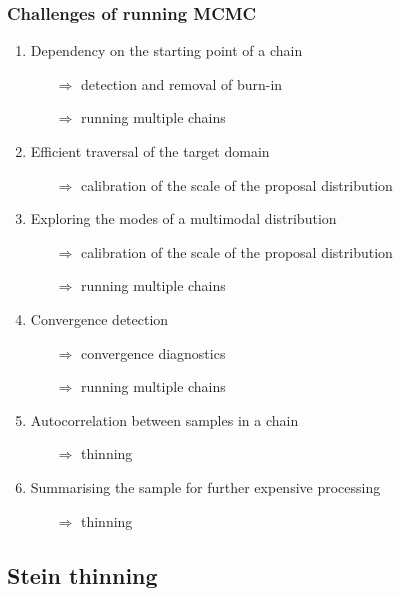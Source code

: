 \documentclass{beamer}
\begin{document}
\begin{frame}
\frametitle{Challenges of running MCMC}

\begin{enumerate}
\item Dependency on the starting point of a chain
    \begin{itemize}
        \item[$\Rightarrow$] detection and removal of burn-in
        \item[$\Rightarrow$] running multiple chains
    \end{itemize}
\item Efficient traversal of the target domain
    \begin{itemize}
        \item[$\Rightarrow$] calibration of the scale of the proposal distribution
    \end{itemize}
\item Exploring the modes of a multimodal distribution
    \begin{itemize}
        \item[$\Rightarrow$] calibration of the scale of the proposal distribution
        \item[$\Rightarrow$] running multiple chains
    \end{itemize}
\item Convergence detection
    \begin{itemize}
        \item[$\Rightarrow$] convergence diagnostics
        \item[$\Rightarrow$] running multiple chains
    \end{itemize}
\item Autocorrelation between samples in a chain
    \begin{itemize}
        \item[$\Rightarrow$] thinning
    \end{itemize}
\item Summarising the sample for further expensive processing
    \begin{itemize}
        \item[$\Rightarrow$] thinning
    \end{itemize}
\end{enumerate}

\end{frame}

\subsection{Stein thinning}
\end{document}
